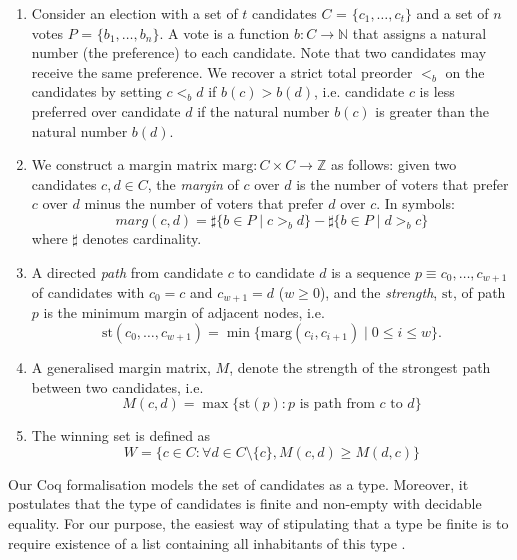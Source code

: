 \documentclass[compsoc,conference,a4paper,10pt,times]{IEEEtran}
\begin{document}
\begin{enumerate}  

\item Consider an election with a set of $t$ candidates
    $C$ = $\{c_1,\dots,c_t\}$ and 
	a set of $n$ votes $P$ = $\{b_1,\dots,b_n\}$. A vote
	is a function $b: C \rightarrow \mathbb{N}$ that 
	assigns a natural 
	number (the preference) to each candidate.  Note that two
  candidates may receive the same preference. 
	We recover a strict total 
	preorder $<_b$ on the candidates by setting $c <_b d$ if $b(c) > b(d)$, i.e. 
	candidate $c$ is less preferred over candidate $d$ if the natural number $b(c)$ is greater
	than the natural number $b(d)$. 
	
\item We construct a margin matrix $\mathrm{marg} : C \times C \to \mathbb{Z}$ as follows: 
    given two candidates $c, d \in C$, the \emph{margin} of $c$ over $d$ is
    the number of voters that prefer $c$ over $d$ minus the number of voters
    that prefer $d$ over $c$. In symbols:
\[
  \mathit{marg} (c, d) = \sharp \lbrace b \in P \mid c >_b d \rbrace -
            \sharp \lbrace b \in P \mid d >_b c \rbrace
\] where $\sharp$ denotes cardinality.


\item A directed \emph{path} from
candidate $c$ to candidate $d$ is a sequence $p \equiv c_0, \dots, c_{w+1}$
of candidates with $c_0 = c$ and $c_{w+1} = d$ ($w \geq 0$), and the
\emph{strength}, $\mathrm{st}$, of path $p$ is the minimum margin of adjacent
nodes, i.e.
\[ \mathrm{st}(c_0, \dots, c_{w+1}) = \min \lbrace \mathrm{marg} (c_i, c_{i+1}) \mid 0 
\leq i \leq w \rbrace. \]
\item  A generalised margin matrix, $M$, denote the strength of the strongest path
	between two candidates, i.e. 
	\[ M(c, d) = \max \lbrace \mathrm{st} (p) : p \text{ is path from } c \text{ to } d\rbrace \]
	
\item The winning set  is defined as 
 \[ W =  \lbrace c \in C : \forall d \in C \setminus \{c\}, M (c, d) \geq M (d, c) \rbrace\]

\end{enumerate}


Our Coq formalisation models the set of candidates as a type.
Moreover, it postulates that the type of candidates 
is finite and non-empty with decidable equality.  For our purpose, 
the easiest way of stipulating that a type be finite is to require existence of a 
list containing all inhabitants of this type \cite{10.1145/2808098.2808102}.
\end{document}
